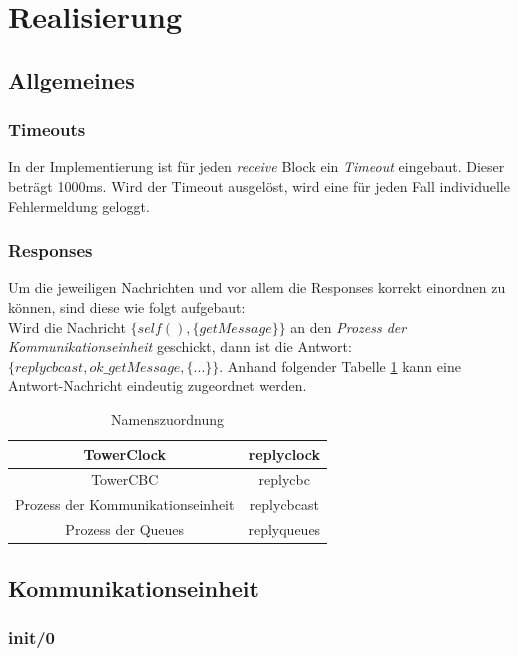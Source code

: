 \section{Realisierung}

\subsection{Allgemeines}

\subsubsection{Timeouts}

In der Implementierung ist für jeden \textit{receive} Block ein \textit{Timeout} eingebaut. Dieser beträgt 1000ms. Wird der Timeout ausgelöst, wird eine für jeden Fall individuelle Fehlermeldung geloggt.

\subsubsection{Responses}

Um die jeweiligen Nachrichten und vor allem die Responses korrekt einordnen zu können, sind diese wie folgt aufgebaut:\\
Wird die Nachricht $\{self(), \{getMessage\}\}$ an den \textit{Prozess der Kommunikationseinheit} geschickt, dann ist die Antwort: $\{replycbcast, ok\_getMessage, \{...\}\}$. Anhand folgender Tabelle \ref{tab:namenszuordnung} kann eine Antwort-Nachricht eindeutig zugeordnet werden.

\begin{table}[h]
    \centering
    \begin{tabular}{|c|c|}
        \hline
        TowerClock & replyclock \\
        \hline
        TowerCBC & replycbc \\
        \hline
        Prozess der Kommunikationseinheit & replycbcast \\
        \hline
        Prozess der Queues & replyqueues \\
        \hline
    \end{tabular}
    \caption{Namenszuordnung}
    \label{tab:namenszuordnung}
\end{table}
\subsection{Kommunikationseinheit}

\subsubsection{init/0} \label{cbcast_init_realisierung}


